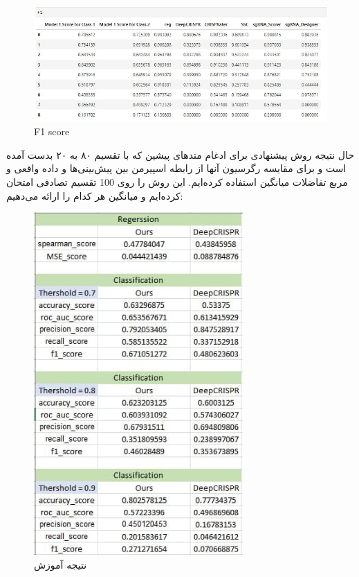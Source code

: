 \documentclass[12pt,a4paper,BCOR=.7cm,headsepline,bibliography=totoc]{report}
\begin{document}
\begin{figure}[H]
\centering
\includegraphics[width=15cm, ]{pictures/DeepCRISPR_F1.jpg}
\caption{
F1 score
}\label{wrap-fig:4}
\end{figure}


حال نتیجه روش‌ پیشنهادی برای ادغام متد‌های پیشین که با تقسیم ۸۰ به ۲۰ بدست آمده است و برای مقایسه رگرسیون آنها از رابطه اسپیرمن بین پیش‌بینی‌ها و داده واقعی و مربع تفاضلات میانگین استفاده کرده‌ایم. این روش را روی 100 تقسیم تصادفی امتحان کرده‌ایم و میانگین هر کدام را ارائه می‌دهیم:

\begin{figure}[H]
\centering
\includegraphics[width=8cm, ]{pictures/best_ensemble3.jpg}
\caption{
نتیجه آموزش
}\label{wrap-fig:4}
\end{figure}
\end{document}

